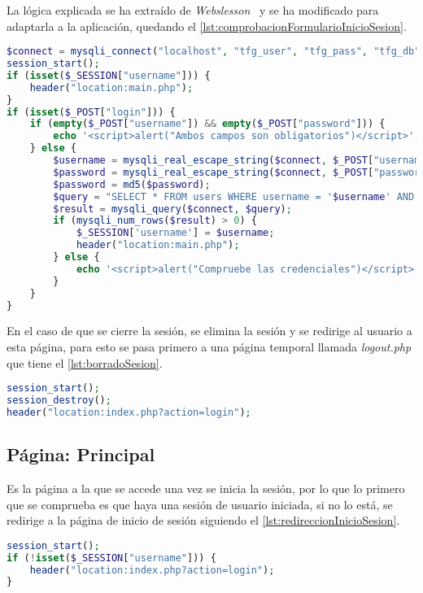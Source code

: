 La lógica explicada se ha extraído de \textit{Webslesson}~\cite{webslesson_php_nodate} y se ha modificado para adaptarla a la aplicación, quedando el \autoref{lst:comprobacionFormularioInicioSesion}.
\begin{lstlisting}[language=PHP, caption=Comprobación formulario Inicio de sesión, label=lst:comprobacionFormularioInicioSesion]
$connect = mysqli_connect("localhost", "tfg_user", "tfg_pass", "tfg_db");
session_start();
if (isset($_SESSION["username"])) {
    header("location:main.php");
}
if (isset($_POST["login"])) {
    if (empty($_POST["username"]) && empty($_POST["password"])) {
        echo '<script>alert("Ambos campos son obligatorios")</script>';
    } else {
        $username = mysqli_real_escape_string($connect, $_POST["username"]);
        $password = mysqli_real_escape_string($connect, $_POST["password"]);
        $password = md5($password);
        $query = "SELECT * FROM users WHERE username = '$username' AND password = '$password'";
        $result = mysqli_query($connect, $query);
        if (mysqli_num_rows($result) > 0) {
            $_SESSION['username'] = $username;
            header("location:main.php");
        } else {
            echo '<script>alert("Compruebe las credenciales")</script>';
        }
    }
}
\end{lstlisting}

En el caso de que se cierre la sesión, se elimina la sesión y se redirige al usuario a esta página, para esto se pasa primero a una página temporal llamada \textit{logout.php} que tiene el \autoref{lst:borradoSesion}.
\begin{lstlisting}[language=PHP, caption=Borrado de sesión y redirección a la página de inicio, label=lst:borradoSesion]
session_start();
session_destroy();
header("location:index.php?action=login");
\end{lstlisting}

\subsection{Página: Principal}\label{subsec:implPagPrincipal}
Es la página a la que se accede una vez se inicia la sesión, por lo que lo primero que se comprueba es que haya una sesión de usuario iniciada, si no lo está, se redirige a la página de inicio de sesión siguiendo el \autoref{lst:redireccionInicioSesion}.
\begin{lstlisting}[language=PHP, caption=Redirección a la página de inicio de sesión si sesión no iniciada, label=lst:redireccionInicioSesion]
session_start();
if (!isset($_SESSION["username"])) {
    header("location:index.php?action=login");
}
\end{lstlisting}

